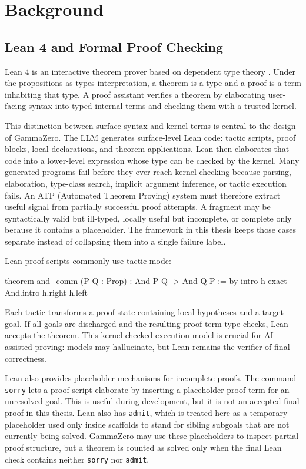\chapter{Background}
\label{sec:background}

\section{Lean 4 and Formal Proof Checking}

Lean 4 is an interactive theorem prover based on dependent type theory \citep{demoura2021lean4}. Under the propositions-as-types interpretation, a theorem is a type and a proof is a term inhabiting that type. A proof assistant verifies a theorem by elaborating user-facing syntax into typed internal terms and checking them with a trusted kernel.

This distinction between surface syntax and kernel terms is central to the design of GammaZero. The LLM
generates surface-level Lean code: tactic scripts, proof blocks, local declarations, and theorem
applications. Lean then elaborates that code into a lower-level expression whose type can be checked by
the kernel. Many generated programs fail before they ever reach kernel checking because parsing,
elaboration, type-class search, implicit argument inference, or tactic execution fails. An ATP (Automated Theorem Proving) system must therefore extract useful signal from partially successful proof attempts. A fragment may be syntactically
valid but ill-typed, locally useful but incomplete, or complete only because it contains a placeholder.
The framework in this thesis keeps those cases separate instead of collapsing them into a single failure
label.

Lean proof scripts commonly use tactic mode:
\begin{leanblock}
theorem and_comm (P Q : Prop) :
  And P Q -> And Q P := by
  intro h
  exact And.intro h.right h.left
\end{leanblock}

Each tactic transforms a proof state containing local hypotheses and a target goal. If all goals are discharged and the resulting proof term type-checks, Lean accepts the theorem. This kernel-checked execution model is crucial for AI-assisted proving: models may hallucinate, but Lean remains the verifier of final correctness.

Lean also provides placeholder mechanisms for incomplete proofs. The command
\texttt{sorry} lets a proof script elaborate by inserting a placeholder proof term
for an unresolved goal. This is useful during development, but it is not an
accepted final proof in this thesis. Lean also has \texttt{admit}, which is treated
here as a temporary placeholder used only inside scaffolds to stand for sibling
subgoals that are not currently being solved. GammaZero may use these placeholders
to inspect partial proof structure, but a theorem is counted as solved only when
the final Lean check contains neither \texttt{sorry} nor \texttt{admit}.


